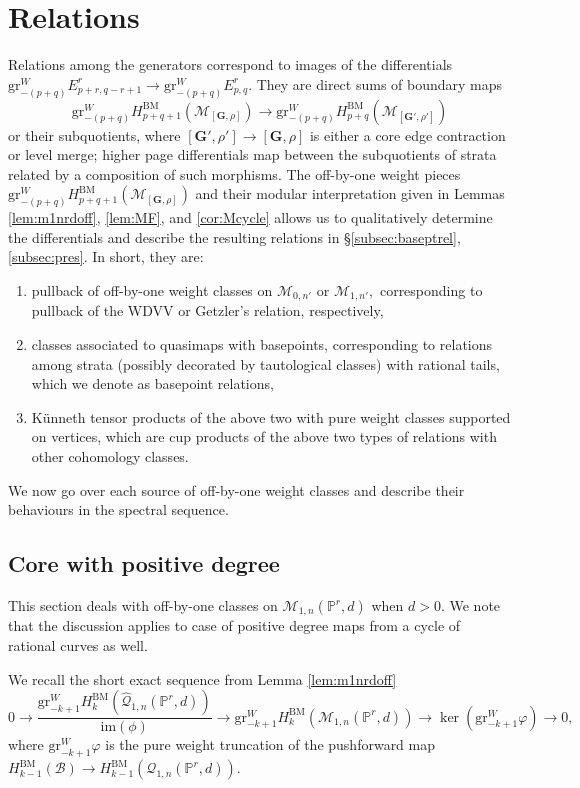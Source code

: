 \documentclass[12pt,reqno]{amsart}
\theoremstyle{definition}
\theoremstyle{definition}
\theoremstyle{definition}
\theoremstyle{definition}
\newcommand{\PP}{\mathbb{P}}
\newcommand{\gr}{\mathrm{gr}}
\begin{document}
\section{Relations}
Relations among the generators correspond to images of the differentials $\gr^W_{-(p+q)}E^r_{p+r, q-r+1}\to \gr^W_{-(p+q)}E^r_{p,q}.$ They are direct sums of boundary maps $$\gr^W_{-(p+q)}H^{\mathrm{BM}}_{p+q+1}(\mathcal{M}_{[\mathbf{G},\rho]})\to \gr^W_{-(p+q)}H^{\mathrm{BM}}_{p+q}(\mathcal{M}_{[\mathbf{G}',\rho']})$$ or their subquotients, where $[\mathbf{G}',\rho']\to [\mathbf{G},\rho]$ is either a core edge contraction or level merge; higher page differentials map between the subquotients of strata related by a composition of such morphisms. The off-by-one weight pieces $\gr^W_{-(p+q)}H^{\mathrm{BM}}_{p+q+1}(\mathcal{M}_{[\mathbf{G},\rho]})$ and their modular interpretation given in Lemmas \ref{lem:m1nrdoff}, \ref{lem:MF}, and \ref{cor:Mcycle} allows us to qualitatively determine the differentials and describe the resulting relations in §\ref{subsec:baseptrel}, \ref{subsec:pres}. In short, they are:
\begin{enumerate}
  \item pullback of off-by-one weight classes on $\mathcal{M}_{0,n'}$ or $\mathcal{M}_{1,n'},$ corresponding to pullback of the WDVV or Getzler's relation, respectively,
  \item classes associated to quasimaps with basepoints, corresponding to relations among strata (possibly decorated by tautological classes) with rational tails, which we denote as basepoint relations,
  \item Künneth tensor products of the above two with pure weight classes supported on vertices, which are cup products of the above two types of relations with other cohomology classes.
\end{enumerate}

We now go over each source of off-by-one weight classes and describe their behaviours in the spectral sequence.

\subsection{Core with positive degree}\label{subsec:basptrelcomp}
This section deals with off-by-one classes on $\mathcal{M}_{1,n}(\PP^r,d)$ when $d>0.$ We note that the discussion applies to case of positive degree maps from a cycle of rational curves as well.

We recall the short exact sequence from Lemma \ref{lem:m1nrdoff}
\[ 0\to \frac{\mathrm{gr}^W_{-k+1}H_k^{\mathrm{BM}}(\hat{\mathcal{Q}}_{1,n}(\mathbb{P}^r,d))}{\mathrm{im}(\phi)}\to \mathrm{gr}^W_{-k+1} H_k^{\mathrm{BM}}(\mathcal{M}_{1,n}(\PP^r,d))\to \ker(\gr^W_{-k+1}\varphi)\to 0,\] where $\gr^W_{-k+1}\varphi$ is the pure weight truncation of the pushforward map $H^{\mathrm{BM}}_{k-1}(\mathcal{B})\to H_{k-1}^{\mathrm{BM}}(\mathcal{Q}_{1,n}(\mathbb{P}^r,d)).$
\end{document}
